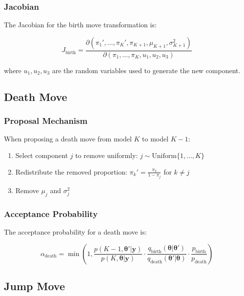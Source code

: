 \documentclass[12pt]{article}
\begin{document}
\subsubsection{Jacobian}

The Jacobian for the birth move transformation is:

\begin{equation}
J_{\text{birth}} = \frac{\partial(\pi_1', \ldots, \pi_K', \pi_{K+1}, \mu_{K+1}, \sigma_{K+1}^2)}{\partial(\pi_1, \ldots, \pi_K, u_1, u_2, u_3)}
\end{equation}

where $u_1, u_2, u_3$ are the random variables used to generate the new component.

\subsection{Death Move}

\subsubsection{Proposal Mechanism}

When proposing a death move from model $K$ to model $K-1$:

\begin{enumerate}
\item Select component $j$ to remove uniformly: $j \sim \text{Uniform}\{1, \ldots, K\}$
\item Redistribute the removed proportion: $\pi_k' = \frac{\pi_k}{1 - \pi_j}$ for $k \neq j$
\item Remove $\mu_j$ and $\sigma_j^2$
\end{enumerate}

\subsubsection{Acceptance Probability}

The acceptance probability for a death move is:

\begin{equation}
\alpha_{\text{death}} = \min\left(1, \frac{p(K-1, \boldsymbol{\theta}'|\mathbf{y})}{p(K, \boldsymbol{\theta}|\mathbf{y})} \cdot \frac{q_{\text{birth}}(\boldsymbol{\theta}|\boldsymbol{\theta}')}{q_{\text{death}}(\boldsymbol{\theta}'|\boldsymbol{\theta})} \cdot \frac{p_{\text{birth}}}{p_{\text{death}}}\right)
\end{equation}

\subsection{Jump Move}
\end{document}
